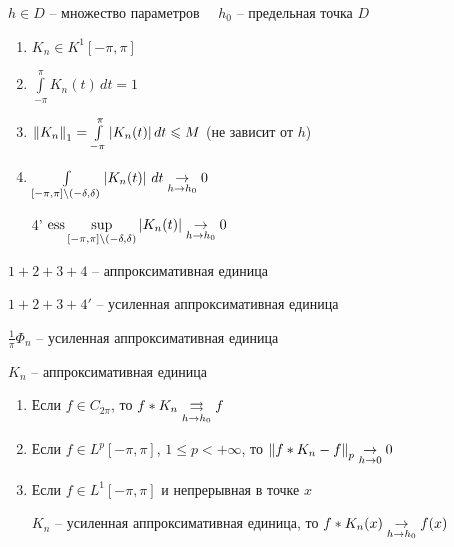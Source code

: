 \begin{definition}\thmslashn

	$h \in D$ -- множество параметров $\quad h_0$ -- предельная точка $D$
	
	\begin{enumerate}
		
		\item
		$K_n \in K^{1}[-\pi, \pi]$
		
		\item
		$\int\limits_{-\pi}^\pi K_n(t)\,dt = 1$
		
		\item
		$\left\|K_n\right\|_1 = \int\limits_{-\pi}^\pi |K_n(t)|\,dt \leqslant M$ (не зависит от $h$)
		
		\item
		$\int\limits_{[-\pi, \pi]\setminus (-\delta, \delta)} \left|K_n(t)\right|\,dt \underset{h \to h_0}\to 0$
		
		\item[4']
		$\operatorname{ess}\sup\limits_{[-\pi, \pi]\setminus (-\delta, \delta)} \left|K_n(t)\right| \underset{h \to h_0}\to 0$
	
	\end{enumerate}

	$1 + 2 + 3 + 4$ -- аппроксимативная единица
	
	$1 + 2 + 3 + 4'$ -- усиленная аппроксимативная единица

\end{definition}

\begin{example}\thmslashn

	$\frac{1}{\pi}\Phi_n$ -- усиленная аппроксимативная единица
	
\end{example}

\begin{theorem}\thmslashn

	$K_n$ -- аппроксимативная единица
	
	\begin{enumerate}
		\item 
		Если $f\in C_{2\pi}$, то $f*K_n \underset{h \to h_0}\rightrightarrows f $
		
		\item
		Если $f \in L^p[-\pi, \pi]$, $1 \leqslant p < +\infty$, то $\left\|f* K_n - f\right\|_p \underset{h \to 0}\to 0$
		
		\item
		Если $f \in L^1[-\pi, \pi]$ и непрерывная в точке $x$
		
		$K_n$ -- усиленная аппроксимативная единица, то $f*K_n(x) \underset{h \to h_0}\to f(x)$
		
	\end{enumerate}
\end{theorem}

